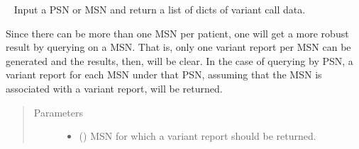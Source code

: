 \documentclass[letterpaper,10pt,english]{sphinxmanual}
\begin{document}
\begin{fulllineitems}
\begin{fulllineitems}
\begin{sphinxVerbatim}[commandchars=\\\{\}]
\PYG{g+go}{                      \PYGZsq{}type\PYGZsq{}: u\PYGZsq{}snvs\PYGZus{}indels\PYGZsq{}\PYGZcb{}],}
\end{sphinxVerbatim}

\end{fulllineitems}


\begin{fulllineitems}
\label{\detokenize{matchbox_api_utils:matchbox_api_utils.match_data.MatchData.get_variant_report}}~\label{\detokenize{matchbox_api_utils:get-variant-report}}
Input a PSN or MSN  and return a list of dicts of variant
call data.

Since there can be more than one MSN per patient, one will get a more
robust result by querying on a MSN.  That is, only one variant report
per MSN can be generated and the results, then, will be clear.  In the
case of querying by PSN, a variant report for each MSN under that PSN,
assuming that the MSN is associated with a variant report, will be
returned.
\begin{quote}\begin{description}
\item[{Parameters}] \leavevmode\begin{itemize}
\item {} 
 () \textendash{} MSN for which a variant report should be returned.


\end{itemize}
\end{description}
\end{quote}
\end{fulllineitems}
\end{fulllineitems}
\end{document}
